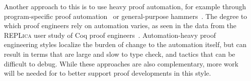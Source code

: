 Another approach to this is to use heavy proof automation, for example through
program-specific proof automation~\cite{Chlipala:2013:CPD:2584504}
or general-purpose hammers~\cite{Blanchette2016b, Blanchette2013, Kaliszyk2014, Czajka2018}.
The degree to which proof engineers rely on automation varies, as seen in the data from the
\textsc{REPLica} user study of Coq proof engineers~\cite{replica}.
Automation-heavy proof engineering styles localize the burden of change to the automation itself,
but can result in terms that are large and slow to type check,
and tactics that can be difficult to debug.
While these approaches are also complementary, more work will be needed for \toolname to better support 
proof developments in this style.



